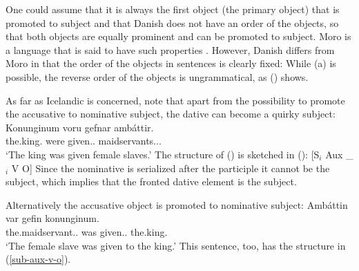 One could assume that it is always the first object (the primary object) that is promoted to subject
and that Danish does not have an order of the objects, so that both objects are equally prominent
and can be promoted to subject. Moro is a language that is said to have such properties
\citep{AMM2013a}. However, Danish differs from Moro in that the order of the objects in sentences is
clearly fixed: While (a) is possible, the reverse order of the objects is ungrammatical, as
() shows.
\z



As far as Icelandic is concerned, \citet*[]{ZMT85a} note that apart from the possibility to
promote the accusative to nominative subject, the dative can become a quirky subject:
\ea
\label{ex-dat-subj-passive-ditransitive-icelandic}
\gll Konunginum voru gefnar ambáttir.\\
     the.king.\DAT{} were given.\F.\PL{} maidservants.\NOM.\F.\PL\\\icelandic
\glt `The king was given female slaves.'
\z
The structure of () is sketched in ():
\ea
\label{sub-aux-v-o}
{}[S$_i$ Aux \_$_i$ V O] 
\z
Since the nominative is serialized after the participle it cannot be the subject, which implies that
the fronted dative element is the subject.

Alternatively the accusative object is promoted to nominative subject:
\ea
\label{ex-nom-subj-passive-ditransitive-icelandic}
\gll Ambáttin var gefin konunginum.\\
     the.maidservant.\NOM.\SG{}  was given.\F.\SG{} the.king.\DAT\\\icelandic
\glt `The female slave was given to the king.'
\z
This sentence, too, has the structure in (\ref{sub-aux-v-o}).

